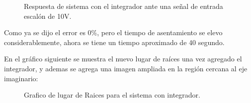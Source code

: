 \documentclass[a4paper,11pt]{article}
\begin{document}
  \begin{figure}[H] %
	\caption{Respuesta de sistema con el integrador ante una señal de entrada escalón de 10V.}
	\label{fig:resp_esc_int}
	\end{figure} 

Como ya se dijo el error es 0\%, pero el tiempo de asentamiento se elevo considerablemente, ahora se tiene un tiempo aproximado de 40 segundo.

En el gráfico siguiente se muestra el nuevo lugar de raíces una vez agregado el integrador, y ademas se agrega una imagen ampliada en la región cercana al eje imaginario:\\

  \begin{figure}[H] %
	\caption{Grafico de lugar de Raices para el sistema con integrador.}
	\label{fig:LR2}
	\end{figure} 
\end{document}
